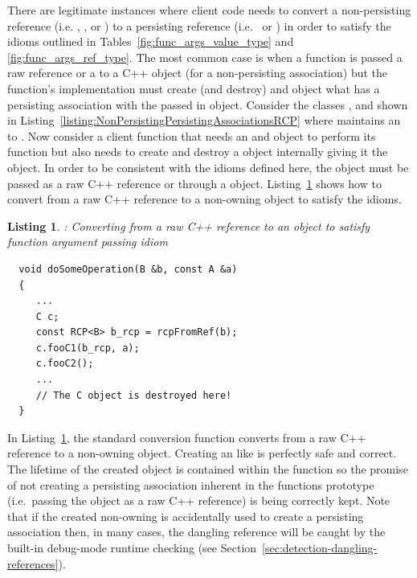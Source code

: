 \documentclass[pdf,ps2pdf,11pt]{SANDreport}
\newtheorem{listing}{Listing}
\begin{document}
There are legitimate instances where client code needs to convert a
non-persisting reference (i.e. {}, {}, or
{}) to a persisting reference (i.e.\ {} or
{}) in order to satisfy the idioms outlined in
Tables~\ref{fig:func_args_value_type} and
{}\ref{fig:func_args_ref_type}.  The most common case is when a
function is passed a raw reference or a {} to a C++ object
(for a non-persisting association) but the function's implementation
must create (and destroy) and object what has a persisting association
with the passed in object.  Consider the classes {}, {}
and {} shown in
Listing~\ref{listing:NonPersistingPersistingAssociationsRCP} where
{} maintains an {} to {}.  Now consider a
client function that needs an {} and {} object to
perform its function but also needs to create and destroy a {}
object internally giving it the {} object.  In order to be
consistent with the idioms defined here, the {} object must be
passed as a raw C++ reference or through a {} object.
Listing~\ref{listing:convert-from-raw-ref-to-RCP} shows how to convert
from a raw C++ reference to a non-owning {} object to satisfy
the idioms.


{}\begin{listing}: Converting from a raw C++ reference to an
{} object to satisfy function argument passing idiom
\label{listing:convert-from-raw-ref-to-RCP}
{\small\begin{verbatim}
  void doSomeOperation(B &b, const A &a)
  {
     ...
     C c;
     const RCP<B> b_rcp = rcpFromRef(b);
     c.fooC1(b_rcp, a);
     c.fooC2();
     ...
     // The C object is destroyed here!
  }
\end{verbatim}}
\end{listing}


In Listing~\ref{listing:convert-from-raw-ref-to-RCP}, the standard
conversion function {} converts from a raw C++
reference to a non-owning {} object.  Creating an {}
like is perfectly safe and correct.  The lifetime of the created
{} object is contained within the function
{} so the promise of not creating a
persisting association inherent in the functions prototype (i.e.\
passing the {} object as a raw C++ reference) is being
correctly kept.  Note that if the created non-owning {} is
accidentally used to create a persisting association then, in many
cases, the dangling reference will be caught by the built-in
debug-mode runtime checking (see
Section~\ref{sec:detection-dangling-references}).
\end{document}
